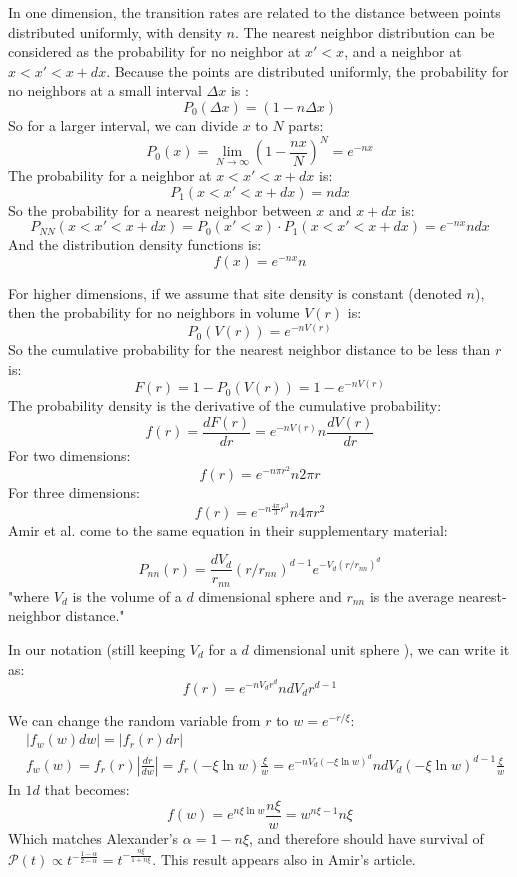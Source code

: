 \documentclass[onecolumn,fleqn]{revtex4}
\newenvironment{fminipage}%
  {\begin{Sbox}\begin{minipage}}%
  {\end{minipage}\end{Sbox}\fbox{\TheSbox}}
\begin{document}
In one dimension, the transition rates are related to the distance between points distributed uniformly, with density $n$. The nearest neighbor distribution can be considered as the probability for no neighbor at $x'<x$, and a neighbor at $x<x'<x+dx$. Because the points are distributed uniformly, the probability for no neighbors at a small interval $\Delta x$ is :
\[P_0(\Delta x) = (1-n\Delta x) \]
So for a larger interval, we can divide $x$ to $N$ parts:
\[P_0(x) = \lim_{N\rightarrow \infty}(1-\frac{nx}{N})^N = e^{-n x} \]
The probability for a neighbor at $x<x'<x+dx$ is:
\[P_1(x<x'<x+dx) = n dx \]
So the probability for a nearest neighbor between $x$ and $x+dx$ is:
\[P_{NN}(x< x'<x+dx) = P_0(x'<x)\cdot P_1(x<x'<x+dx) = e^{-n x}ndx \]
And the distribution density functions is:
\[ f(x) = e^{-n x}n\]

For higher dimensions, if we assume that site density is constant (denoted $n$), then the probability for no neighbors in volume $V(r)$ is:
\[ P_0( V(r)) = e^{-nV(r)}\]
So the cumulative probability for the nearest neighbor distance to be less than $r$ is:
\[ F (r) = 1-P_0(V(r)) = 1- e^{-nV(r)} \]
The probability density is the derivative of the cumulative probability:
\[ f(r) = \frac{dF(r)}{dr} =   e^{-nV(r)} n \frac{dV(r)}{dr} \]
For two dimensions:
\[ f(r) = e^{-n \pi r^2}n2\pi r \]
For three dimensions:
\[ f(r) = e^{-n \frac{4\pi}{3} r^3}n4\pi r^2 \]
Amir et al. \cite{Amir:2010:PRL} come to the same equation in their supplementary material:

\begin{fminipage}{\textwidth}
\[P_{nn}(r)=\frac{d
V_d}{r_{nn}} {(r/r_{nn})}^{d-1} e^{-V_d {(r/r_{nn})}^d}\] 
"where $V_d$ is the volume of a $d$ dimensional sphere and $r_{nn}$ is the
average nearest-neighbor distance." 
\end{fminipage}

In our notation (still keeping $V_d$ for a $d$ dimensional unit sphere ), we can write it as:
\[ f(r) = e^{-n V_d r^d} ndV_d r^{d-1} \]


We can change the random variable from $r$ to $w= e^{-r/ \xi}$:
\begin{align*}
    &|f_w(w)dw| = |f_r(r)dr| \\
    &f_w(w) = f_r(r)\left|\frac{dr}{dw}\right| = f_r(-\xi \ln w)\frac{\xi}{w} = e^{-nV_d (-\xi\ln w)^d} ndV_d (-\xi\ln w)^{d-1}\frac{\xi}{w}
\end{align*}
In $1d$ that becomes:
\[ f(w)= e^{n \xi\ln w} \frac{n\xi}{w} = w^{n\xi-1}n\xi\]
Which matches Alexander's $\alpha = 1-n\xi$, and therefore should have survival of $\mathcal{P}(t)\propto t^{-\frac{1-\alpha}{2-\alpha}}= t^{-\frac{n\xi}{1+n\xi}}$. This result appears also in Amir's article.
\end{document}
